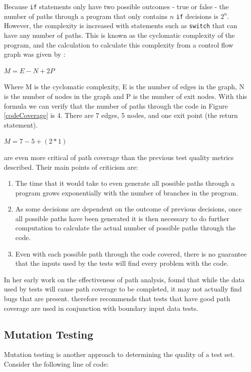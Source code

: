 Because \verb+if+ statements only have two possible outcomes - true or false - the number of paths through a program that only contains $n$ \verb+if+ decisions is $2^n$. However, the complexity is increased with statements such as \verb+switch+ that can have any number of paths. This is known as the cyclomatic complexity of the program, and the calculation to calculate this complexity from a control flow graph was given by \citet{1702388}:

$M = E - N + 2P$

Where M is the cyclomatic complexity, E is the number of edges in the graph, N is the number of nodes in the graph and P is the number of exit nodes. With this formula we can verify that the number of paths through the code in Figure \ref{codeCoverage} is 4. There are 7 edges, 5 nodes, and one exit point (the return statement).

$M = 7 - 5 + (2*1)$

\citet{Myers:2004:AST:983238} are even more critical of path coverage than the previous test quality metrics described. Their main points of criticism are:

\begin{enumerate}
\item The time that it would take to even generate all possible paths through a program grows exponentially with the number of branches in the program.
\item As some decisions are dependent on the outcome of previous decisions, once all possible paths have been generated it is then necessary to do further computation to calculate the actual number of possible paths through the code.
\item Even with each possible path through the code covered, there is no guarantee that the inputs used by the tests will find every problem with the code.
\end{enumerate}

In her early work on the effectiveness of path analysis, \citet{1658851} found that while the data used by tests will cause path coverage to be completed, it may not actually find bugs that are present.  therefore recommends that tests that have good path coverage are used in conjunction with boundary input data tests.

\subsection{Mutation Testing}

Mutation testing is another approach to determining the quality of a test set. Consider the following line of code:

